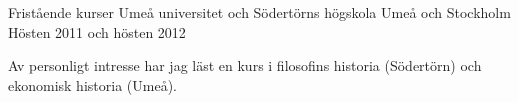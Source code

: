 \begin{cventries}
\cventry
{Fristående kurser} %
{Umeå universitet och Södertörns högskola} %
{Umeå och Stockholm} %
{Hösten 2011 och hösten 2012} %
{ %
\begin{cvitems}
\item {Av personligt intresse har jag läst en kurs i filosofins historia (Södertörn) och ekonomisk historia (Umeå).}
\end{cvitems}
}

\end{cventries}